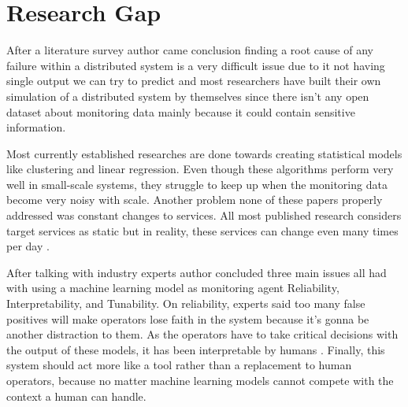 \section{Research Gap}

After a literature survey author came conclusion finding a root cause of any failure within a distributed system is a very difficult issue due to it not having single output we can try to predict and most researchers have built their own simulation of a distributed system by themselves since there isn't any open dataset about monitoring data mainly because it could contain sensitive information. 

Most currently established researches are done towards creating statistical models like clustering and linear regression. Even though these algorithms perform very well in small-scale systems, they struggle to keep up when the monitoring data become very noisy with scale. Another problem none of these papers properly  addressed was constant changes to services. All most published research considers target services as static but in reality, these services can change even many times per day \citep{GoingtoM51:online}.

After talking with industry experts author concluded three main issues all had with using a machine learning model as monitoring agent Reliability, Interpretability, and Tunability. On reliability, experts said too many false positives will make operators lose faith in the system because it's gonna be another distraction to them. As the operators have to take critical decisions with the output of these models, it has been interpretable by humans \citep{ribeiro2016should}. Finally, this system should act more like a tool rather than a replacement to human operators, because no matter machine learning models cannot compete with the context a human can handle. 
